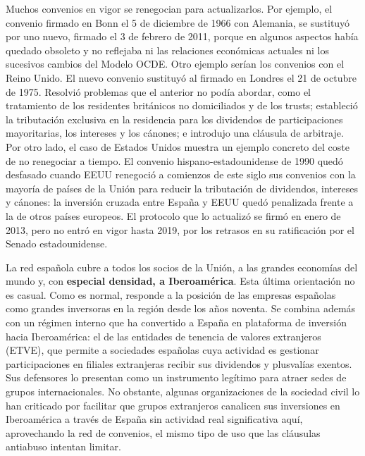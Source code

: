 \documentclass[10pt,a4paper]{article}
\begin{document}
Muchos convenios en vigor se renegocian para actualizarlos. Por ejemplo, el convenio firmado en Bonn el 5 de diciembre de 1966 con Alemania, se sustituyó por uno nuevo, firmado el 3 de febrero de 2011, porque en algunos aspectos había quedado obsoleto y no reflejaba ni las relaciones económicas actuales ni los sucesivos cambios del Modelo OCDE. Otro ejemplo serían los convenios con el Reino Unido. El nuevo convenio sustituyó al firmado en Londres el 21 de octubre de 1975. Resolvió problemas que el anterior no podía abordar, como el tratamiento de los residentes británicos no domiciliados y de los trusts; estableció la tributación exclusiva en la residencia para los dividendos de participaciones mayoritarias, los intereses y los cánones; e introdujo una cláusula de arbitraje. Por otro lado, el caso de Estados Unidos muestra un ejemplo concreto del coste de no renegociar a tiempo. El convenio hispano-estadounidense de 1990 quedó desfasado cuando EEUU renegoció a comienzos de este siglo sus convenios con la mayoría de países de la Unión para reducir la tributación de dividendos, intereses y cánones: la inversión cruzada entre España y EEUU quedó penalizada frente a la de otros países europeos. El protocolo que lo actualizó se firmó en enero de 2013, pero no entró en vigor hasta 2019, por los retrasos en su ratificación por el Senado estadounidense.

La red española cubre a todos los socios de la Unión, a las grandes economías del mundo y, con \textbf{especial densidad, a Iberoamérica}. Esta última orientación no es casual. Como es normal, responde a la posición de las empresas españolas como grandes inversoras en la región desde los años noventa. Se combina además con un régimen interno que ha convertido a España en plataforma de inversión hacia Iberoamérica: el de las entidades de tenencia de valores extranjeros (ETVE), que permite a sociedades españolas cuya actividad es gestionar participaciones en filiales extranjeras recibir sus dividendos y plusvalías exentos. Sus defensores lo presentan como un instrumento legítimo para atraer sedes de grupos internacionales. No obstante, algunas organizaciones de la sociedad civil lo han criticado por facilitar que grupos extranjeros canalicen sus inversiones en Iberoamérica a través de España sin actividad real significativa aquí, aprovechando la red de convenios, el mismo tipo de uso que las cláusulas antiabuso intentan limitar.
\end{document}
